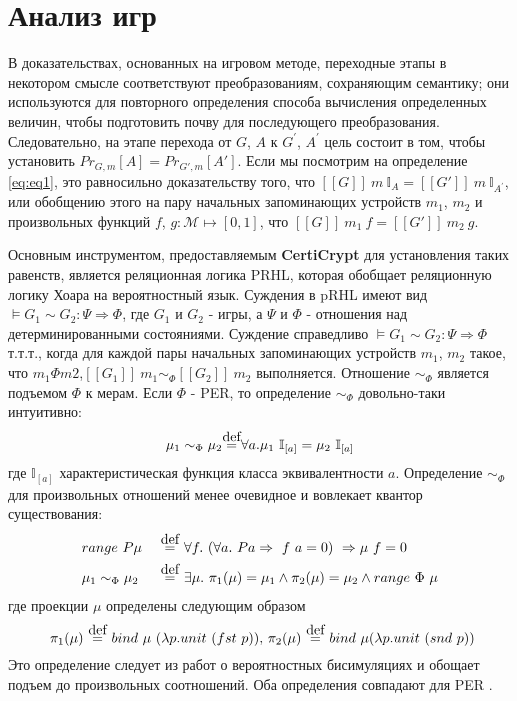 \documentclass[a4paper,12pt]{report}
\newcommand\myeq{\stackrel{\mathclap{\normalfont\mbox{def}}}{=}}
\begin{document}
\section{Анализ игр}
В доказательствах, основанных на игровом методе, переходные этапы в некотором смысле соответствуют преобразованиям, сохраняющим семантику; они используются для повторного определения способа вычисления определенных величин, чтобы подготовить почву для последующего преобразования. Следовательно, на этапе перехода от $G$, $A$ к $G^\prime$, $A^\prime$ цель состоит в том, чтобы установить $Pr_{G,m}[A] = Pr_{G',m}[A']$. Если мы посмотрим на определение \eqref{eq:eq1}, это равносильно доказательству того, что $[\![G]\!] \ m \ \mathbb{I}_A = [\![G']\!] \  m \ \mathbb{I}_{A^\prime} $, или обобщению этого на пару начальных запоминающих устройств $m_1$, $m_2$ и произвольных функций $f$, $g:\mathcal{M} \mapsto [0,1]$, что $ [\![G]\!] \ m_1 \ f = [\![G']\!] \  m_2 \ g $.
\par
Основным инструментом, предоставляемым \textbf{CertiCrypt} для установления таких равенств, является реляционная логика PRHL, которая обобщает реляционную логику Хоара \cite{10} на вероятностный язык. Суждения в pRHL имеют вид $\models G_1 \sim G_2 : \Psi \Rightarrow \Phi $, где $G_1$ и $G_2$ - игры, а $\Psi$ и $\Phi$ - отношения над детерминированными состояниями. Суждение  справедливо $\models G_1 \sim G_2 : \Psi \Rightarrow \Phi $ т.т.т., когда для каждой пары начальных запоминающих устройств $m_1$, $m_2$ такое, что $m_1 \Phi m2$,$ [\![G_1]\!] \ m_1   \sim_\Phi [\![G_2]\!] \ m_2 $ выполняется. Отношение $\sim_\Phi$ является подъемом $\Phi$ к мерам. Если $\Phi$ - PER, то определение $\sim_\Phi$ довольно-таки интуитивно:
\[ \mu_1 \sim_\Phi \mu_2 \myeq \forall a. \mu_1 \ \mathbb{I}_{[a]} = \mu_2 \ \mathbb{I}_{[a]}\]
где $\mathbb{I}_{[a]}$ характеристическая функция класса эквивалентности $a$. Определение $\sim_\Phi$ для произвольных отношений менее очевидное и вовлекает квантор существования:
\begin{align*}
  & range \ P \mu \  & &\myeq \ \forall f. \ (\forall a. \ P a \Rightarrow \ f \ a = 0) \  \Rightarrow \mu \ f = 0 \\
  & \mu_1 \sim_\Phi \mu_2 & &\myeq \  \exists \mu. \ \pi_1 (\mu) = \mu_1 \wedge \pi_2(\mu) = \mu_2 \wedge range \ \Phi \ \mu
\end{align*}
где проекции $\mu$ определены следующим образом
\[ \ \pi_1(\mu) \ \myeq \ bind \ \mu \ (\lambda p.unit \ (fst \ p)) \text{, } \pi_2(\mu) \ \myeq \ bind \ \mu (\lambda p. unit \ (snd \ p)) \]
Это определение следует из работ о вероятностных бисимуляциях и обощает подъем до произвольных соотношений. Оба определения совпадают для PER \cite{11}.
\end{document}
